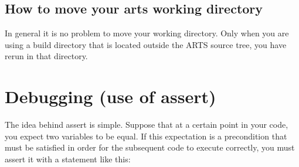

\subsection{How to move your arts working directory}

In general it is no problem to move your working directory. Only when you are
using a build directory that is located outside the ARTS source tree, you
have rerun  in that directory.

\section{Debugging (use of assert)}
\label{sec:development:assert}
 
The idea behind assert is simple. Suppose that at a certain point in
your code, you expect two variables to be equal.  If this expectation
is a precondition that must be satisfied in order for the subsequent
code to execute correctly, you must assert it with a statement like
this:
\begin{quote}
\end{quote}

